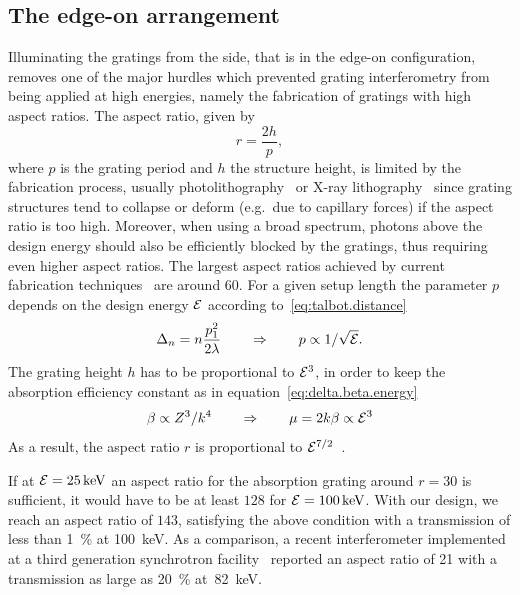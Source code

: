 \subsection{The edge-on arrangement}\label{sec:edge-on-arrangement}
Illuminating the gratings from the side, that is in the edge-on
configuration, removes one of the major hurdles which prevented grating interferometry from
being applied at high energies, namely the fabrication of gratings
with high aspect ratios. The aspect ratio, given by
\begin{equation}
    r = \frac{2h}{p},
\end{equation}
where $p$ is the
grating period and $h$ the  structure height, is limited by the
fabrication process, usually photolithography~\cite{David2002} or X-ray
lithography~\cite{Mohr2012} since grating structures tend to collapse or deform
(e.g.\ due to capillary forces) if the aspect ratio is too high.
Moreover, when using a broad spectrum, photons above the design energy
should also be efficiently blocked by the gratings, thus requiring even
higher aspect ratios. The largest aspect ratios achieved by current
fabrication techniques~\cite{David2007,Kenntner2010} are around 60.
For a given setup length the parameter $p$ depends on the design energy
$\mathcal{E}$ according to~\eqref{eq:talbot.distance}
\begin{equation}
    \Delta_n = n \frac{p_1^2}{2 \lambda} \qquad \Rightarrow \qquad p \propto 1/\sqrt{\mathcal{E}}.\label{eq:period.energy}
\end{equation}
The grating height $h$ has to be proportional to $\mathcal{E}^3$, in order to
keep the absorption efficiency constant as in
equation~\eqref{eq:delta.beta.energy}
\begin{equation}
    \beta \propto Z^3 / k^4 \qquad \Rightarrow \qquad \mu = 2k\beta \propto
    \mathcal{E}^3
    \label{eq:absorption.energy}
\end{equation}
As a result, the aspect ratio $r$ is proportional to $\mathcal{E}^{7/2}$~\cite{Momose2003a}.

If at $\mathcal{E}=\SI{25}{\kilo\electronvolt}$ an aspect ratio for the
absorption grating around $r=30$ is sufficient, it would have
to be at least $\num{128}$ for $\energy=\SI{100}{\kilo\eV}$. With our
design, we reach an aspect ratio of $\num{143}$, satisfying the above
condition with a transmission of less than \SI{1}{\percent} at
\SI{100}{\kilo\eV}. As a comparison, a recent interferometer implemented at
a third generation synchrotron facility~\cite{Willner2013} reported an
aspect ratio of \num{21} with a transmission as large as \SI{20}{\percent}
at~\SI{82}{\kilo\eV}.

